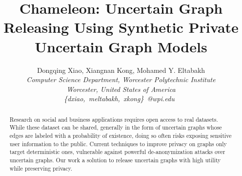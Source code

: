 \documentclass[10pt,conference,letterpaper]{IEEEtran}
\title{Chameleon: Uncertain Graph Releasing Using Synthetic Private Uncertain Graph Models}
\author{%
{Dongqing Xiao, Xiangnan Kong, Mohamed Y. Eltabakh}%
\vspace{1.4mm}\\
\fontsize{10}{10}\selectfont\itshape
Computer Science Department, Worcester Polytechnic Institute \\
Worcester, United States of America\\
\fontsize{9}{9}\selectfont\ttfamily\upshape
\{dxiao,~meltabakh,~xkong\}~@wpi.edu\
}
\theoremstyle{plain}
\begin{document}
\maketitle


%

\begin{abstract}  
Research on social and business applications requires open access to real datasets. While these dataset can be shared, generally in the form of uncertain graphs whose edges are labeled with a probability of existence, doing so often risks exposing sensitive user information to the public. Current techniques to improve privacy on graphs only target deterministic ones, vulnerable against powerful de-anonymization attacks over uncertain graphs. Our work a solution to release uncertain graphs with high utility while preserving privacy. 
\end{abstract}




\end{document}

